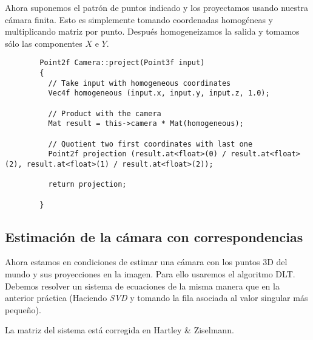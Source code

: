 \documentclass[a4paper, 11pt]{article}
\theoremstyle{definition}
\begin{document}
      Ahora suponemos el patrón de puntos indicado y los proyectamos usando nuestra
      cámara finita. Esto es simplemente tomando coordenadas homogéneas y multiplicando
      matriz por punto. Después homogeneizamos la salida y tomamos sólo las componentes $X$ e $Y$.


      \begin{lstlisting}
        Point2f Camera::project(Point3f input)
        {
          // Take input with homogeneous coordinates
          Vec4f homogeneous (input.x, input.y, input.z, 1.0);

          // Product with the camera
          Mat result = this->camera * Mat(homogeneous);

          // Quotient two first coordinates with last one
          Point2f projection (result.at<float>(0) / result.at<float>(2), result.at<float>(1) / result.at<float>(2));

          return projection;

        }
      \end{lstlisting}

      \subsection{Estimación de la cámara con correspondencias}
      Ahora estamos en condiciones de estimar una cámara con los puntos 3D del mundo y
      sus proyecciones en la imagen. Para ello usaremos el algoritmo DLT. Debemos resolver
      un sistema de ecuaciones de la misma manera que en la anterior práctica (Haciendo \emph{SVD} y tomando la fila asociada al valor singular más pequeño).

      La matriz del sistema está corregida en Hartley \& Ziselmann.
\end{document}
